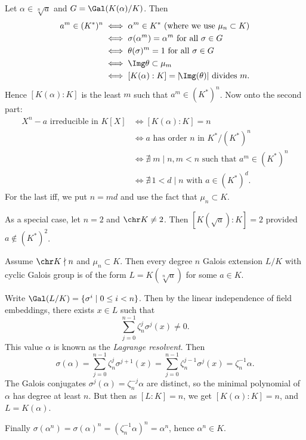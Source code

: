 \documentclass[12pt]{article}
\begin{document}
\begin{proofbox}
	Let $\alpha \in \sqrt[n]a$ and $G = \Gal(K(\alpha)/K)$. Then
	\begin{align*}
		a^m \in (K^{\ast})^n &\iff \alpha^m \in K^{\ast} \text{ (where we use $\mu_n \subset K$)} \\
				     &\iff \sigma(\alpha^m) = \alpha^m \text{ for all } \sigma \in G \\
				     &\iff \theta(\sigma)^m = 1 \text{ for all } \sigma \in G \\
				     &\iff \Img \theta \subset \mu_m \\
				     &\iff [K(\alpha):K] = |\!\Img(\theta)| \text{ divides } m.
	\end{align*}
	Hence $[K(\alpha):K]$ is the least $m$ such that $a^m \in (K^{\ast})^n$. Now onto the second part:
	\begin{align*}
		X^n - a \text{ irreducible in } K[X] &\iff [K(\alpha):K] = n \\
						     &\iff a \text{ has order $n$ in } K^{\ast}/(K^{\ast})^n \\
						     &\iff \nexists \; m \mid n, m < n \text{ such that } a^m \in (K^{\ast})^n \\
						     &\iff \nexists\, 1 < d \mid n \text{ with } a \in (K^{\ast})^d.
	\end{align*}
	For the last iff, we put $n = md$ and use the fact that $\mu_n \subset K$.
\end{proofbox}

As a special case, let $n= 2$ and $\chr K \neq 2$. Then $[K(\sqrt a) : K] = 2$ provided $a \not \in (K^{\ast})^2$.


\begin{theorem}
	Assume $\chr K \nmid n$ and $\mu_n \subset K$. Then every degree $n$ Galois extension $L/K$ with cyclic Galois group is of the form $L = K(\sqrt[n]a)$ for some $a \in K$.
\end{theorem}

\begin{proofbox}
	Write $\Gal(L/K) = \{\sigma^{i} \mid 0 \leq i < n\}$. Then by the linear independence of field embeddings, there exists $x \in L$ such that
	\[
	\sum_{j = 0}^{n-1} \zeta_n^{j} \sigma^j(x) \neq 0.
	\]
	This value $\alpha$ is known as the \emph{Lagrange resolvent}. Then
	\[
	\sigma(\alpha) = \sum_{j = 0}^{n-1} \zeta_n^{j} \sigma^{j+1}(x) = \sum_{j = 0}^{n-1} \zeta_n^{j-1} \sigma^{j}(x) = \zeta_n^{-1} \alpha.
	\]
	The Galois conjugates $\sigma^{j}(\alpha) = \zeta_n^{-j}\alpha$ are distinct, so the minimal polynomial of $\alpha$ has degree at least $n$. But then as $[L:K] = n$, we get $[K(\alpha):K] = n$, and $L = K(\alpha)$.

	Finally $\sigma(\alpha^{n}) = \sigma(\alpha)^{n} = (\zeta_n^{-1}\alpha)^{n} = \alpha^{n}$, hence $\alpha^{n} \in K$.
\end{proofbox}
\end{document}
